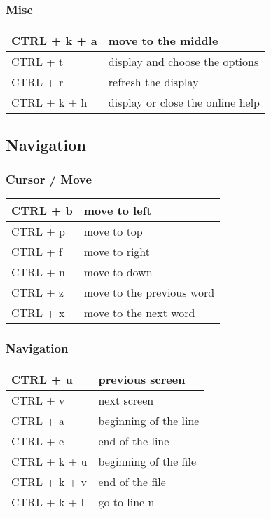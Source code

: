 \documentclass[letterpaper,10pt,english]{sphinxmanual}
\begin{document}
\subsubsection{Misc}
\label{editor/joe:misc}
\begin{tabulary}{\linewidth}{|L|L|}
\hline

CTRL + k + a
 & 
move to the middle
\\
\hline
CTRL + t
 & 
display and choose the options
\\
\hline
CTRL + r
 & 
refresh the display
\\
\hline
CTRL + k + h
 & 
display or close the online help
\\
\hline\end{tabulary}



\subsection{Navigation}
\label{editor/joe:navigation}

\subsubsection{Cursor / Move}
\label{editor/joe:cursor-move}
\begin{tabulary}{\linewidth}{|L|L|}
\hline

CTRL + b
 & 
move to left
\\
\hline
CTRL + p
 & 
move to top
\\
\hline
CTRL + f
 & 
move to right
\\
\hline
CTRL + n
 & 
move to down
\\
\hline
CTRL + z
 & 
move to the previous word
\\
\hline
CTRL + x
 & 
move to the next word
\\
\hline\end{tabulary}



\subsubsection{Navigation}
\label{editor/joe:id1}
\begin{tabulary}{\linewidth}{|L|L|}
\hline

CTRL + u
 & 
previous screen
\\
\hline
CTRL + v
 & 
next screen
\\
\hline
CTRL + a
 & 
beginning of the line
\\
\hline
CTRL + e
 & 
end of the line
\\
\hline
CTRL + k + u
 & 
beginning of the file
\\
\hline
CTRL + k + v
 & 
end of the file
\\
\hline
CTRL + k + l
 & 
go to line n
\\
\hline\end{tabulary}
\end{document}
